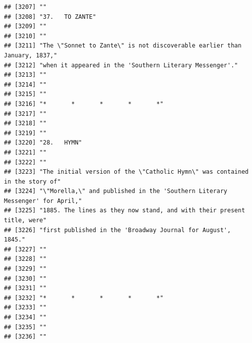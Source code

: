 \documentclass{article}\usepackage[]{graphicx}\usepackage[]{color}
\makeatletter
\newenvironment{kframe}{%
 \def\at@end@of@kframe{}%
 \ifinner\ifhmode%
  \def\at@end@of@kframe{\end{minipage}}%
  \begin{minipage}{\columnwidth}%
 \fi\fi%
 \def\FrameCommand##1{\hskip\@totalleftmargin \hskip-\fboxsep
 \colorbox{shadecolor}{##1}\hskip-\fboxsep
     \hskip-\linewidth \hskip-\@totalleftmargin \hskip\columnwidth}%
 \MakeFramed {\advance\hsize-\width
   \@totalleftmargin\z@ \linewidth\hsize
   \@setminipage}}%
 {\par\unskip\endMakeFramed%
 \at@end@of@kframe}
\newenvironment{knitrout}{}{} %
\makeatother
\begin{document}
\begin{knitrout}
\begin{kframe}
\begin{verbatim}
## [3207] ""                                                                            
## [3208] "37.   TO ZANTE"                                                              
## [3209] ""                                                                            
## [3210] ""                                                                            
## [3211] "The \"Sonnet to Zante\" is not discoverable earlier than January, 1837,"     
## [3212] "when it appeared in the 'Southern Literary Messenger'."                      
## [3213] ""                                                                            
## [3214] ""                                                                            
## [3215] ""                                                                            
## [3216] "*       *       *       *       *"                                           
## [3217] ""                                                                            
## [3218] ""                                                                            
## [3219] ""                                                                            
## [3220] "28.   HYMN"                                                                  
## [3221] ""                                                                            
## [3222] ""                                                                            
## [3223] "The initial version of the \"Catholic Hymn\" was contained in the story of"  
## [3224] "\"Morella,\" and published in the 'Southern Literary Messenger' for April,"  
## [3225] "1885. The lines as they now stand, and with their present title, were"       
## [3226] "first published in the 'Broadway Journal for August', 1845."                 
## [3227] ""                                                                            
## [3228] ""                                                                            
## [3229] ""                                                                            
## [3230] ""                                                                            
## [3231] ""                                                                            
## [3232] "*       *       *       *       *"                                           
## [3233] ""                                                                            
## [3234] ""                                                                            
## [3235] ""                                                                            
## [3236] ""                                                                            

\end{verbatim}
\end{kframe}
\end{knitrout}
\end{document}
